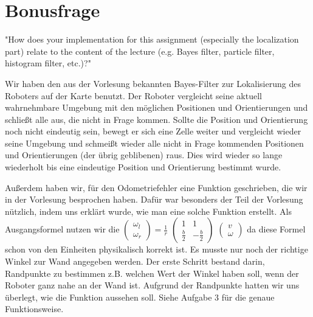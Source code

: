 \newpage
\section{Bonusfrage}
"How does your implementation for this assignment (especially the localization part) relate to the content of the lecture (e.g. Bayes filter, particle filter, histogram filter, etc.)?"

Wir haben den aus der Vorlesung bekannten Bayes-Filter zur Lokalisierung des Roboters auf der Karte benutzt. Der Roboter vergleicht seine aktuell wahrnehmbare Umgebung mit den möglichen Positionen und Orientierungen und schließt alle aus, die nicht in Frage kommen. Sollte die Position und Orientierung noch nicht eindeutig sein, bewegt er sich eine Zelle weiter und vergleicht wieder seine Umgebung und schmeißt wieder alle nicht in Frage kommenden Positionen und Orientierungen (der übrig geblibenen) raus. Dies wird wieder so lange wiederholt bis eine eindeutige Position und Orientierung bestimmt wurde. 

Au{\ss}erdem haben wir, f\"ur den Odometriefehler eine Funktion geschrieben, die wir in der Vorlesung besprochen haben.
Daf\"ur war besonders der Teil der Vorlesung n\"utzlich, indem uns erkl\"art wurde, wie man eine solche Funktion erstellt.
Als Ausgangsformel nutzen wir die
$\left(\begin{array}{c} \omega_l \\ \omega_r \end{array}\right) = \frac{1}{r}$
$\left(\begin{array}{rr} 1 & 1 \\ \frac{b}{2} & -\frac{b}{2} \end{array} \right)$
$\left(\begin{array}{c} v \\ \omega \end{array}\right)$
da diese Formel schon von den Einheiten physikalisch korrekt ist.
Es musste nur noch der richtige Winkel zur Wand angegeben werden.
Der erste Schritt bestand darin, Randpunkte zu bestimmen
z.B. welchen Wert der Winkel haben soll, wenn der Roboter ganz nahe an der Wand ist.
Aufgrund der Randpunkte hatten wir uns \"uberlegt, wie die Funktion aussehen soll.
Siehe Aufgabe 3 f\"ur die genaue Funktionsweise.
